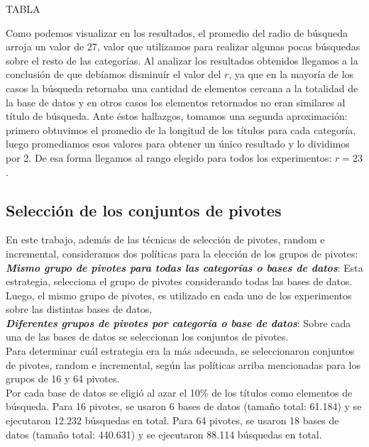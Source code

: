  TABLA %

Como podemos visualizar en los resultados, el promedio del radio de b\'usqueda arroja un valor de 27, valor que utilizamos para realizar algunas pocas b\'usquedas sobre el resto de las categor\'ias. Al analizar los resultados obtenidos llegamos a la conclusi\'on de que deb\'iamos disminu\'ir el valor del $r$, ya que en la mayor\'ia de los casos la b\'usqueda retornaba una cantidad de elementos cercana a la totalidad de la base de datos y en otros casos los elementos retornados no eran similares al t\'itulo de b\'usqueda. Ante \'estos hallazgos, tomamos una segunda aproximaci\'on: primero obtuvimos el promedio de la longitud de los t\'itulos para cada categor\'ia, luego promediamos esos valores para obtener un \'unico resultado y lo dividimos por 2.  De esa forma llegamos al rango elegido para todos los experimentos: $r=23$.\\


\subsection{Selecci\'on de los conjuntos de pivotes}

En este trabajo, adem\'as de las t\'ecnicas de selecci\'on de pivotes, random e incremental, consideramos dos pol\'iticas para la elecci\'on de los grupos de pivotes:\\

\noindent  \textit{\textbf{Mismo grupo de pivotes para todas las categor\'ias o bases de datos}}: Esta estrategia, selecciona el grupo de pivotes considerando todas las bases de datos. Luego, el mismo grupo de pivotes, es utilizado en cada uno de los experimentos sobre las distintas bases de datos.\\

\noindent  \textit{\textbf{Diferentes grupos de pivotes por categor\'ia o base de datos}}: Sobre cada una de las bases de datos se seleccionan los conjuntos de pivotes.\\

Para determinar cu\'al estrategia era la m\'as adecuada, se seleccionaron conjuntos de pivotes, random e incremental, seg\'un las pol\'iticas arriba mencionadas para los grupos de 16 y 64 pivotes.\\

Por cada base de datos se eligi\'o al azar el 10\% de los t\'itulos como elementos de b\'usqueda. Para 16 pivotes, se usaron 6 bases de datos (tamaño total: 61.184) y se ejecutaron 12.232  b\'usquedas en total. Para 64 pivotes, se usaron 18 bases de datos (tamaño total: 440.631) y se ejecutaron 88.114 b\'usquedas en total.\\

